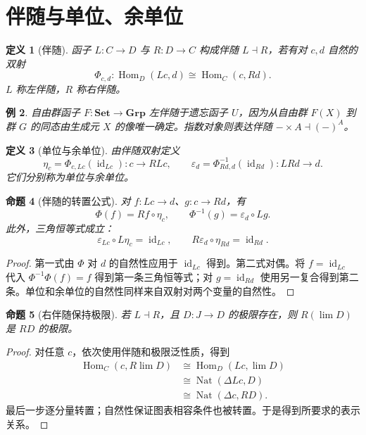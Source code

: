 \documentclass[12pt,oneside,openany,fontset=none]{ctexbook}
\theoremstyle{cn}
\newtheorem{definition}{定义}[chapter]
\newtheorem{example}[definition]{例}
\newtheorem{proposition}[definition]{命题}
\numberwithin{equation}{chapter}
\newcommand{\Set}{\mathbf{Set}}
\newcommand{\id}{\operatorname{id}}
\newcommand{\Hom}{\operatorname{Hom}}
\newcommand{\Nat}{\operatorname{Nat}}
\newcommand{\limm}{\operatorname*{lim}}
\begin{document}
\section{伴随与单位、余单位}
\begin{definition}[伴随]
函子 $L:C\to D$ 与 $R:D\to C$ 构成伴随 $L\dashv R$，若有对 $c,d$ 自然的双射
\[
\Phi_{c,d}:\Hom_D(Lc,d)\cong\Hom_C(c,Rd).
\]
$L$ 称左伴随，$R$ 称右伴随。
\end{definition}
\begin{example}
自由群函子 $F:\Set\to\mathbf{Grp}$ 左伴随于遗忘函子 $U$，因为从自由群 $F(X)$ 到群 $G$ 的同态由生成元 $X$ 的像唯一确定。指数对象则表达伴随 $-\times A\dashv(-)^A$。
\end{example}
\begin{definition}[单位与余单位]
由伴随双射定义
\[
\eta_c=\Phi_{c,Lc}(\id_{Lc}):c\to RLc,
\qquad
\varepsilon_d=\Phi^{-1}_{Rd,d}(\id_{Rd}):LRd\to d.
\]
它们分别称为单位与余单位。
\end{definition}
\begin{proposition}[伴随的转置公式]
对 $f:Lc\to d$、$g:c\to Rd$，有
\[
\Phi(f)=Rf\circ\eta_c,
\qquad
\Phi^{-1}(g)=\varepsilon_d\circ Lg.
\]
此外，三角恒等式成立：
\[
\varepsilon_{Lc}\circ L\eta_c=\id_{Lc},
\qquad R\varepsilon_d\circ\eta_{Rd}=\id_{Rd}.
\]
\end{proposition}
\begin{proof}
第一式由 $\Phi$ 对 $d$ 的自然性应用于 $\id_{Lc}$ 得到。第二式对偶。将 $f=\id_{Lc}$ 代入 $\Phi^{-1}\Phi(f)=f$ 得到第一条三角恒等式；对 $g=\id_{Rd}$ 使用另一复合得到第二条。单位和余单位的自然性同样来自双射对两个变量的自然性。
\end{proof}
\begin{proposition}[右伴随保持极限]
若 $L\dashv R$，且 $D:J\to D$ 的极限存在，则 $R(\limm D)$ 是 $RD$ 的极限。
\end{proposition}
\begin{proof}
对任意 $c$，依次使用伴随和极限泛性质，得到
\begin{align*}
\Hom_C(c,R\limm D)
&\cong\Hom_D(Lc,\limm D)\\
&\cong\Nat(\Delta Lc,D)\\
&\cong\Nat(\Delta c,RD).
\end{align*}
最后一步逐分量转置；自然性保证图表相容条件也被转置。于是得到所要求的表示关系。
\end{proof}
\end{document}
